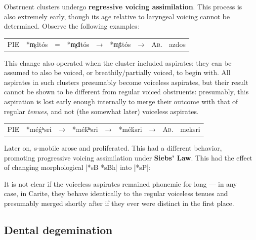 \documentclass[svgnames,x11names,b5paper]{book}
\begin{document}
        Obstruent clusters undergo \textbf{regressive voicing assimilation}. This process is also extremely early, though its age relative to laryngeal voicing cannot be determined. Observe the following examples:

            \begin{table}[H]
                \begin{center}
                \begin{tabular}{llcllllll}
                \textsc{PIE} & *m̥dtós & = & *m̥\textbf{d}tós & → & *m̥\textbf{t}tós & → & \textsc{Ab.} & azdos\\
                \end{tabular}
                \end{center}
                \end{table}
        
        This change also operated when the cluster included aspirates: they can be assumed to also be voiced, or breathily/partially voiced, to begin with. All aspirates in such clusters presumably become voiceless aspirates, but their result cannot be shown to be different from regular voiced obstruents: presumably, this aspiration is lost early enough internally to merge their outcome with that of regular \textit{tenues}, and not (the somewhat later) voiceless aspirates.

            \begin{table}[H]
                \begin{center}
                \begin{tabular}{llcllllll}
                \textsc{PIE} & *méǵʰsri & → & *méḱ\textbf{ʰ}sri & → & *méḱsri & → & \textsc{Ab.} & meksri\\
                \end{tabular}
                \end{center}
                \end{table}
        
        Later on, s-mobile arose and proliferated. This had a different behavior, promoting progressive voicing assimilation under \textbf{Siebs' Law}. This had the effect of changing morphological |*sB *sBh| into |*sP|:

            It is not clear if the voiceless aspirates remained phonemic for long — in any case, in Carite, they behave identically to the regular voiceless tenues and presumably merged shortly after if they ever were distinct in the first place.

            \subsection{Dental degemination}
        
\end{document}
